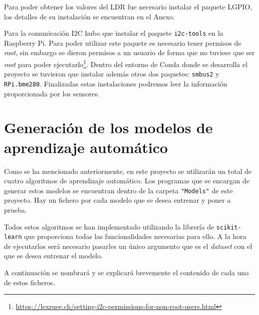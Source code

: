 \documentclass[a4paper, 12pt]{book}
\begin{document}
Para poder obtener los valores del LDR fue necesario instalar el paquete LGPIO, los detalles de su instalación se encuentran en el Anexo.

Para la comunicación I2C hubo que instalar el paquete \texttt{i2c-tools} en la Raspberry Pi. Para poder utilizar este paquete es necesario tener permisos de \textit{root}, sin embargo se dieron permisos a un usuario de forma que no tuviese que ser \textit{root} para poder ejecutarlo\footnote{\url{https://lexruee.ch/setting-i2c-permissions-for-non-root-users.html}}. Dentro del entorno de Conda donde se desarrolla el proyecto se tuvieron que instalar además otros dos paquetes: \texttt{smbus2} y \texttt{RPi.bme280}. Finalizadas estas instalaciones podremos leer la información proporcionada por los sensores.

\section{Generación de los modelos de aprendizaje automático}
\label{sec:generacion_modelos}

Como se ha mencionado anteriormente, en este proyecto se utilizarán un total de cuatro algoritmos de aprendizaje automático. Los programas que se encargan de generar estos modelos se encuentran dentro de la carpeta \texttt{"Models"} de este proyecto. Hay un fichero por cada modelo que se desea entrenar y poner a prueba.

Todos estos algoritmos se han implementado utilizando la librería de \texttt{scikit-learn} que proporciona todas las funcionalidades necesarias para ello. A la hora de ejecutarlos será necesario pasarles un único argumento que es el \textit{dataset} con el que se desea entrenar el modelo.

A continuación se nombrará y se explicará brevemente el contenido de cada uno de estos ficheros.
\end{document}
